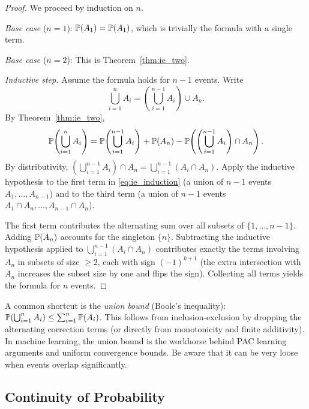 \documentclass[11pt,a4paper]{article}
\begin{document}
\begin{proof}
We proceed by induction on $n$.

\emph{Base case} ($n = 1$): $\mathbb{P}(A_1) = \mathbb{P}(A_1)$, which is trivially
the formula with a single term.

\emph{Base case} ($n = 2$): This is Theorem~\ref{thm:ie_two}.

\emph{Inductive step.} Assume the formula holds for $n - 1$ events. Write
\[
    \bigcup_{i=1}^n A_i
    = \left(\bigcup_{i=1}^{n-1} A_i\right) \cup A_n.
\]
By Theorem~\ref{thm:ie_two},
\begin{equation}
\label{eq:ie_induction}
    \mathbb{P}\!\left(\bigcup_{i=1}^n A_i\right)
    = \mathbb{P}\!\left(\bigcup_{i=1}^{n-1} A_i\right) + \mathbb{P}(A_n)
    - \mathbb{P}\!\left(\left(\bigcup_{i=1}^{n-1} A_i\right) \cap A_n\right).
\end{equation}
By distributivity,
$\left(\bigcup_{i=1}^{n-1} A_i\right) \cap A_n
= \bigcup_{i=1}^{n-1} (A_i \cap A_n)$.
Apply the inductive hypothesis to the first term in \eqref{eq:ie_induction}
(a union of $n-1$ events $A_1, \ldots, A_{n-1}$) and to the third term
(a union of $n-1$ events $A_1 \cap A_n, \ldots, A_{n-1} \cap A_n$).

The first term contributes the alternating sum over all subsets of
$\{1, \ldots, n-1\}$. Adding $\mathbb{P}(A_n)$ accounts for the singleton
$\{n\}$. Subtracting the inductive hypothesis applied to
$\bigcup_{i=1}^{n-1}(A_i \cap A_n)$ contributes exactly the terms
involving $A_n$ in subsets of size $\geq 2$, each with sign
$(-1)^{k+1}$ (the extra intersection with $A_n$ increases the subset
size by one and flips the sign). Collecting all terms yields the formula
for $n$ events.
\end{proof}

\begin{warning}[title={Union Bound as a Corollary}]
A common shortcut is the \emph{union bound} (Boole's inequality):
$\mathbb{P}(\bigcup_{i=1}^n A_i) \leq \sum_{i=1}^n \mathbb{P}(A_i)$.
This follows from inclusion-exclusion by dropping the
alternating correction terms (or directly from monotonicity and finite
additivity). In machine learning, the union bound is the workhorse
behind PAC learning arguments and uniform convergence bounds. Be aware
that it can be very loose when events overlap significantly.
\end{warning}

\subsection{Continuity of Probability}
\end{document}
